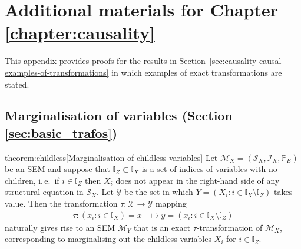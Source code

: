 \chapter{Additional materials for Chapter \ref{chapter:causality}}\label{chapter:appendix-causality}

This appendix provides proofs for the results in Section~\ref{sec:causality-causal-examples-of-transformations} in which examples of exact transformations are stated.

\section{Marginalisation of variables (Section \ref{sec:basic_trafos})}



\begin{reptheorem}{theorem:childless}[Marginalisation of childless variables]
Let $\mathcal{M}_X=(\mathcal{S}_X,\mathcal{I}_X,\mathbb{P}_E)$ be an SEM and suppose that ${\mathbb{I}_Z\subset\mathbb{I}_X}$ is a set of indices of variables with no children, i.\,e.\ if $i\in\mathbb{I}_Z$ then $X_i$ does not appear in the right-hand side of any structural equation in $\mathcal{S}_X$.
Let $\mathcal{Y}$ be the set in which $Y = \left( X_i: i\in\mathbb{I}_X\setminus \mathbb{I}_Z \right)$ takes value.
Then the transformation $\tau: \mathcal{X} \to \mathcal{Y}$ mapping
\begin{align*}
   \tau: \left( x_i: i\in\mathbb{I}_X \right) = x &\mapsto y = \left( x_i: i\in\mathbb{I}_X\setminus \mathbb{I}_Z \right)
\end{align*}
naturally gives rise to an SEM $\mathcal{M}_Y$ that is an exact $\tau$-transformation of $\mathcal{M}_X$, corresponding to marginalising out the childless variables $X_i$ for $i\in\mathbb{I}_Z$.
\end{reptheorem}

\medskip


